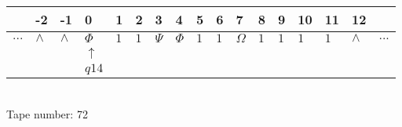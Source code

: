 \documentclass{article}
\begin{document}
\begin{table}[H]
\centering
\begin{tabular}{lllllllllllllllll}
 & -2 & -1 & 0 & 1 & 2 & 3 & 4 & 5 & 6 & 7 & 8 & 9 & 10 & 11 & 12 & \\
\hline
$...$ & \multicolumn{1}{|l|}{$\wedge$} & \multicolumn{1}{|l|}{$\wedge$} & \multicolumn{1}{|l|}{$\Phi$} & \multicolumn{1}{|l|}{$1$} & \multicolumn{1}{|l|}{$1$} & \multicolumn{1}{|l|}{$\Psi$} & \multicolumn{1}{|l|}{$\Phi$} & \multicolumn{1}{|l|}{$1$} & \multicolumn{1}{|l|}{$1$} & \multicolumn{1}{|l|}{$\Omega$} & \multicolumn{1}{|l|}{$1$} & \multicolumn{1}{|l|}{$1$} & \multicolumn{1}{|l|}{$1$} & \multicolumn{1}{|l|}{$1$} & \multicolumn{1}{|l|}{$\wedge$} & $...$\\
\hline
&  &  & $\uparrow$ &  &  &  &  &  &  &  &  &  &  &  &  &  \\
&  &  & $ q14 $ &  &  &  &  &  &  &  &  &  &  &  &  &  \\
\end{tabular}
\\
Tape number: 72
\noindent\makebox[\linewidth]{\hdashrule{\textwidth}{1pt}{1pt}}\end{table}
\end{document}
